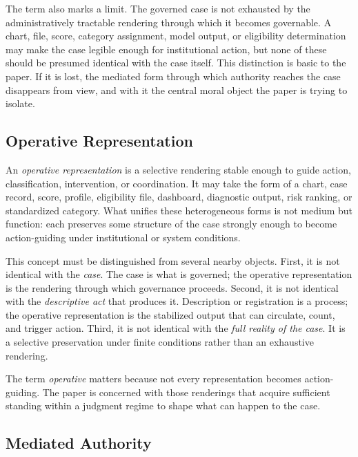 \documentclass[11pt]{article}
\renewcommand{\emph}[1]{\textit{#1}}
\begin{document}
The term also marks a limit. The governed case is not exhausted by the administratively tractable rendering through which it becomes governable. A chart, file, score, category assignment, model output, or eligibility determination may make the case legible enough for institutional action, but none of these should be presumed identical with the case itself. This distinction is basic to the paper. If it is lost, the mediated form through which authority reaches the case disappears from view, and with it the central moral object the paper is trying to isolate.

\subsection{Operative Representation}

An \emph{operative representation} is a selective rendering stable enough to guide action, classification, intervention, or coordination. It may take the form of a chart, case record, score, profile, eligibility file, dashboard, diagnostic output, risk ranking, or standardized category. What unifies these heterogeneous forms is not medium but function: each preserves some structure of the case strongly enough to become action-guiding under institutional or system conditions. \cite{FriggNguyen2021ScientificRepresentationSEP,FriggHartmann2025ModelsScienceSEP,Swanson2026ConstraintConditionDisclosure}

This concept must be distinguished from several nearby objects. First, it is not identical with the \emph{case}. The case is what is governed; the operative representation is the rendering through which governance proceeds. Second, it is not identical with the \emph{descriptive act} that produces it. Description or registration is a process; the operative representation is the stabilized output that can circulate, count, and trigger action. Third, it is not identical with the \emph{full reality of the case}. It is a selective preservation under finite conditions rather than an exhaustive rendering.

The term \emph{operative} matters because not every representation becomes action-guiding. The paper is concerned with those renderings that acquire sufficient standing within a judgment regime to shape what can happen to the case.

\subsection{Mediated Authority}
\end{document}
